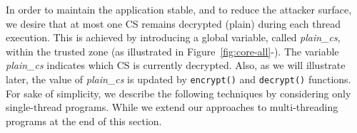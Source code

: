In order to maintain the application stable, and to reduce the attacker 
surface, we desire that at most one CS remains decrypted (plain) during each 
thread execution.
This is achieved by introducing a global variable, called \emph{plain\_cs}, 
within the trusted zone (as illustrated in Figure~\ref{fig:core-all}-).
The variable \emph{plain\_cs} indicates which CS is currently decrypted.
Also, as we will illustrate later, the value of \emph{plain\_cs} is updated by 
\texttt{encrypt()} and \texttt{decrypt()} functions.
For sake of simplicity, we describe the following techniques by considering 
only single-thread programs.
While we extend our approaches to multi-threading programs at the end of this 
section.



